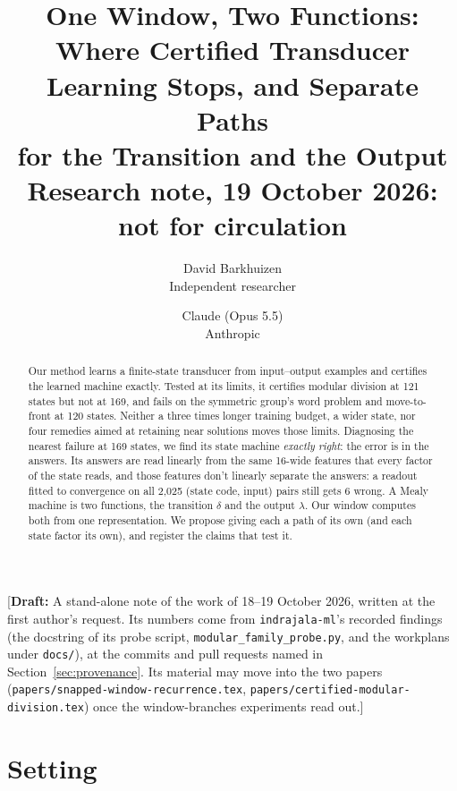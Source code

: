 \documentclass[11pt]{article}
\title{One Window, Two Functions:\\Where Certified Transducer Learning Stops, and Separate Paths\\for the Transition and the Output\\[0.5em]
\large Research note, 19 October 2026: not for circulation}
\author{
  David Barkhuizen\\
  Independent researcher
  \and
  Claude (Opus 5.5)\\
  Anthropic
}
\date{}
\newcommand{\draftnote}[1]{\textcolor{red!70!black}{[\textbf{Draft:} #1]}}
\begin{document}
\maketitle

\draftnote{A stand-alone note of the work of 18--19 October 2026, written at the first author's
request. Its numbers come from \texttt{indrajala-ml}'s recorded findings (the docstring of its
probe script, \texttt{modular\_family\_probe.py}, and the workplans under \texttt{docs/}),
at the commits and pull requests named in Section~\ref{sec:provenance}. Its material may move into
the two papers (\texttt{papers/snapped-window-recurrence.tex}, \texttt{papers/certified-modular-division.tex})
once the window-branches experiments read out.}

\begin{abstract}
Our method learns a finite-state transducer from input--output examples and certifies the learned
machine exactly. Tested at its limits, it certifies modular division at 121 states but not at 169,
and fails on the symmetric group's word problem and move-to-front at 120 states. Neither a three
times longer training budget, a wider state, nor four remedies aimed at retaining near solutions
moves those limits. Diagnosing the nearest failure at 169 states, we find its state machine
\emph{exactly right}: the error is in the answers. Its answers are read linearly from the same
16-wide features that every factor of the state reads, and those features don't linearly separate
the answers: a readout fitted to convergence on all 2{,}025 (state code, input) pairs still gets 6
wrong. A Mealy machine is two functions, the transition $\delta$ and the output $\lambda$. Our
window computes both from one representation. We propose giving each a path of its own (and each
state factor its own), and register the claims that test it.
\end{abstract}

\section{Setting}
\end{document}
